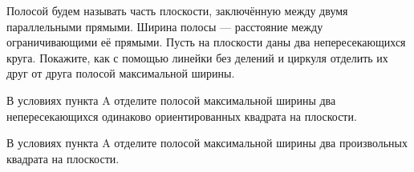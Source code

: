 ﻿
\begin{enumerate}

\itA Полосой будем называть часть плоскости, заключённую между двумя параллельными прямыми. Ширина полосы — расстояние между ограничивающими её прямыми. Пусть на плоскости даны два непересекающихся круга. Покажите, как с помощью линейки без делений и циркуля отделить их друг от друга полосой максимальной ширины.

\itB В условиях пункта A отделите полосой максимальной ширины два непересекающихся одинаково ориентированных квадрата на плоскости.

\itC В условиях пункта A отделите полосой максимальной ширины два произвольных квадрата на плоскости.
\end{enumerate}